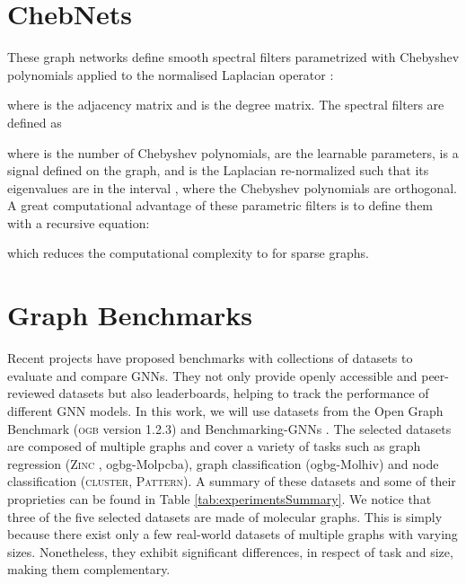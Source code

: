 \documentclass[letterpaper]{article} \usepackage{aaai21}  \usepackage{times}  \usepackage{helvet} \usepackage{courier}  \usepackage[hyphens]{url}  \usepackage{graphicx} \usepackage{natbib}  \usepackage{caption} \frenchspacing  \setlength{\pdfpagewidth}{8.5in}  \setlength{\pdfpageheight}{11in}
\begin{document}
\section{ChebNets \cite{defferrard_convolutional_nodate}}
These graph networks define smooth spectral filters  parametrized with Chebyshev polynomials  applied to the normalised Laplacian operator :

where  is the adjacency matrix and  is the degree matrix. The spectral filters  are defined as

where  is the number of Chebyshev polynomials,  are the learnable parameters,  is a signal defined on the graph, and  is the Laplacian re-normalized such that its eigenvalues are in the interval , where the Chebyshev polynomials are orthogonal. A great computational advantage of these parametric filters is to define them with a recursive equation:

which reduces the computational complexity to  for sparse graphs.


























\section{Graph Benchmarks}


Recent projects \cite{hu_open_2020, dwivedi_benchmarking_2020-1} have proposed benchmarks with collections of datasets to evaluate and compare GNNs. They not only provide openly accessible and peer-reviewed datasets but also leaderboards, helping to track the performance of different GNN models.
In this work, we will use datasets from the Open Graph Benchmark (\textsc{ogb} version 1.2.3) \cite{hu_open_2020} and Benchmarking-GNNs \cite{dwivedi_benchmarking_2020}.
The selected datasets are composed of multiple graphs and cover a variety of tasks such as graph regression (\textsc{Zinc} , ogbg-Molpcba), graph classification (ogbg-Molhiv) and node classification (\textsc{cluster}, \textsc{Pattern}). A summary of these datasets and some of their proprieties can be found in Table \ref{tab:experimentsSummary}.
We notice that three of the five selected datasets are made of molecular graphs. This is simply because there exist only a few real-world datasets  of multiple graphs with varying sizes. Nonetheless, they exhibit significant differences, in respect of task and size, making them complementary.
\end{document}
